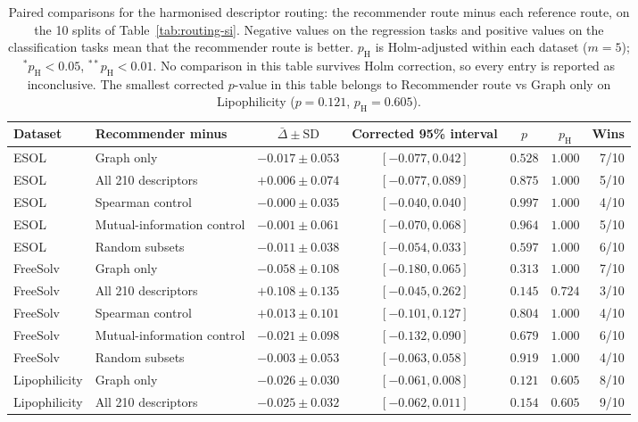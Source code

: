 \documentclass[10pt,a4paper]{article}
\renewcommand{\thetable}{S\arabic{table}}
\begin{document}
\begin{table}[H]
\renewcommand{\thetable}{S11}
\caption{Paired comparisons for the harmonised descriptor routing: the recommender route minus each reference route, on the 10 splits of Table~\ref{tab:routing-si}. Negative values on the regression tasks and positive values on the classification tasks mean that the recommender route is better. $p_{\mathrm{H}}$ is Holm-adjusted within each dataset ($m=5$); $^{*}p_{\mathrm{H}}<0.05$, $^{**}p_{\mathrm{H}}<0.01$. No comparison in this table survives Holm correction, so every entry is reported as inconclusive. The smallest corrected $p$-value in this table belongs to Recommender route vs Graph only on Lipophilicity ($p=0.121$, $p_{\mathrm{H}}=0.605$).}\label{tab:routing-stats}
\centering\scriptsize
\setlength{\tabcolsep}{4pt}
\begin{tabular}{@{}llccccr@{}}
\toprule
Dataset & Recommender minus & $\bar\Delta\pm\mathrm{SD}$ & Corrected 95\% interval & $p$ & $p_{\mathrm{H}}$ & Wins \\
\midrule
ESOL & Graph only & $-0.017\pm0.053$ & $[-0.077,0.042]$ & $0.528$ & $1.000$ & 7/10 \\
ESOL & All 210 descriptors & $+0.006\pm0.074$ & $[-0.077,0.089]$ & $0.875$ & $1.000$ & 5/10 \\
ESOL & Spearman control & $-0.000\pm0.035$ & $[-0.040,0.040]$ & $0.997$ & $1.000$ & 4/10 \\
ESOL & Mutual-information control & $-0.001\pm0.061$ & $[-0.070,0.068]$ & $0.964$ & $1.000$ & 5/10 \\
ESOL & Random subsets & $-0.011\pm0.038$ & $[-0.054,0.033]$ & $0.597$ & $1.000$ & 6/10 \\
\midrule
FreeSolv & Graph only & $-0.058\pm0.108$ & $[-0.180,0.065]$ & $0.313$ & $1.000$ & 7/10 \\
FreeSolv & All 210 descriptors & $+0.108\pm0.135$ & $[-0.045,0.262]$ & $0.145$ & $0.724$ & 3/10 \\
FreeSolv & Spearman control & $+0.013\pm0.101$ & $[-0.101,0.127]$ & $0.804$ & $1.000$ & 4/10 \\
FreeSolv & Mutual-information control & $-0.021\pm0.098$ & $[-0.132,0.090]$ & $0.679$ & $1.000$ & 6/10 \\
FreeSolv & Random subsets & $-0.003\pm0.053$ & $[-0.063,0.058]$ & $0.919$ & $1.000$ & 4/10 \\
\midrule
Lipophilicity & Graph only & $-0.026\pm0.030$ & $[-0.061,0.008]$ & $0.121$ & $0.605$ & 8/10 \\
Lipophilicity & All 210 descriptors & $-0.025\pm0.032$ & $[-0.062,0.011]$ & $0.154$ & $0.605$ & 9/10 \\

\end{tabular}
\end{table}
\end{document}
